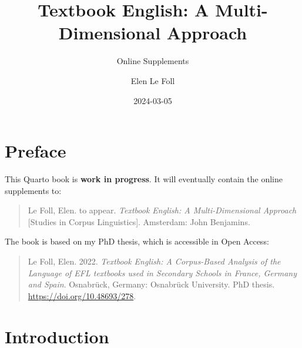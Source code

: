\documentclass[
  letterpaper,
  DIV=11,
  numbers=noendperiod]{scrreprt}
\title{Textbook English: A Multi-Dimensional Approach}
\subtitle{Online Supplements}
\author{Elen Le Foll}
\date{2024-03-05}
\renewcommand*\contentsname{Table of contents}
\newcommand\contentsname{Table of contents}
\begin{document}
\maketitle

\renewcommand*\contentsname{Table of contents}
{
\hypersetup{linkcolor=}
\setcounter{tocdepth}{2}
\tableofcontents
}

\chapter*{Preface}\label{preface}


This Quarto book is \textbf{work in progress}. It will eventually
contain the online supplements to:

\begin{quote}
Le Foll, Elen. to appear. \emph{Textbook English: A Multi-Dimensional
Approach} {[}Studies in Corpus Linguistics{]}. Amsterdam: John
Benjamins.
\end{quote}

The book is based on my PhD thesis, which is accessible in Open Access:

\begin{quote}
Le Foll, Elen. 2022. \emph{Textbook English: A Corpus-Based Analysis of
the Language of EFL textbooks used in Secondary Schools in France,
Germany and Spain}. Osnabrück, Germany: Osnabrück University. PhD
thesis. \url{https://doi.org/10.48693/278}.
\end{quote}


\chapter{Introduction}\label{introduction}
\end{document}
